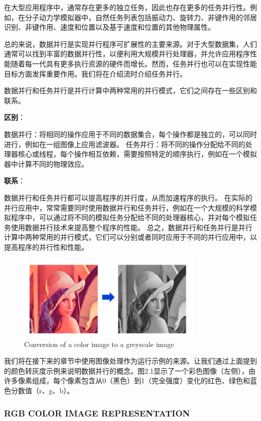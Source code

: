 \documentclass[11pt]{ctexart}
\begin{document}
在大型应用程序中，通常存在更多的独立任务，因此也存在更多的任务并行性。例如，在分子动力学模拟器中，自然任务列表包括振动力、旋转力、非键作用的邻居识别、非键作用、速度和位置以及基于速度和位置的其他物理属性。

总的来说，数据并行是实现并行程序可扩展性的主要来源。对于大型数据集，人们通常可以找到丰富的数据并行性，以便利用大规模并行处理器，并允许应用程序性能随着每一代具有更多执行资源的硬件而增长。然而，任务并行也可以在实现性能目标方面发挥重要作用。我们将在介绍流时介绍任务并行。

数据并行和任务并行是并行计算中两种常用的并行模式，它们之间存在一些区别和联系。

\textbf{区别}：

数据并行：将相同的操作应用于不同的数据集合，每个操作都是独立的，可以同时进行，例如在一组图像上应用滤波器。
任务并行：将不同的操作分配给不同的处理器核心或线程，每个操作相互依赖，需要按照特定的顺序执行，例如在一个模拟器中计算不同的物理效应。

\textbf{联系}：


数据并行和任务并行都可以提高程序的并行度，从而加速程序的执行。
在实际的并行应用中，常常需要同时使用数据并行和任务并行，例如在一个大规模的科学模拟程序中，可以通过将不同的模拟任务分配给不同的处理器核心，并对每个模拟任务使用数据并行技术来提高整个程序的性能。
总之，数据并行和任务并行是并行计算中两种常用的并行模式，它们可以分别或者同时应用于不同的并行应用中，以提高程序的并行性和性能。
\begin{figure}[ht]
	\centering
	\includegraphics[width=0.8\textwidth]{photos/colorimage.png}
	\caption{Conversion of a color image to a greyscale image}
	\label{fig:1}
\end{figure}
我们将在接下来的章节中使用图像处理作为运行示例的来源。让我们通过上面提到的颜色转灰度示例来说明数据并行的概念。图2.1显示了一个彩色图像（左侧），由许多像素组成，每个像素包含从0（黑色）到1（完全强度）变化的红色、绿色和蓝色分数值（r、g、b）。

\subsubsection{RGB COLOR IMAGE REPRESENTATION}
\end{document}
